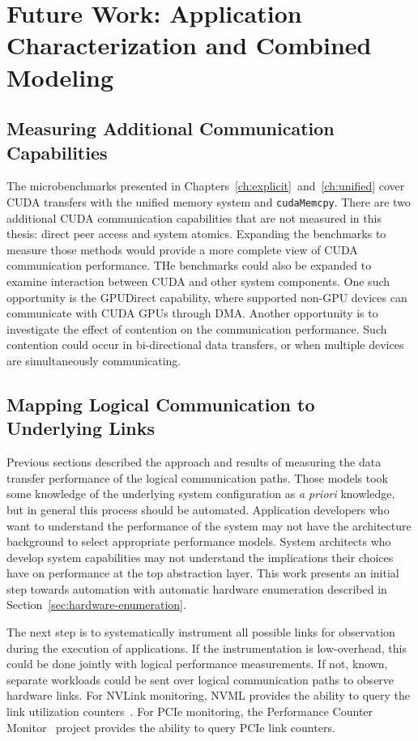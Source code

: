 \chapter{Future Work: Application Characterization and Combined Modeling}
\label{ch:future}

\section{Measuring Additional Communication Capabilities}

The microbenchmarks presented in Chapters~\ref{ch:explicit}~and~\ref{ch:unified} cover CUDA transfers with the unified memory system and \texttt{cudaMemcpy}.
There are two additional CUDA communication capabilities that are not measured in this thesis: direct peer access and system atomics.
Expanding the benchmarks to measure those methods would provide a more complete view of CUDA communication performance.
THe benchmarks could also be expanded to examine interaction between CUDA and other system components.
One such opportunity is the GPUDirect capability, where supported non-GPU devices can communicate with CUDA GPUs through DMA.
Another opportunity is to investigate the effect of contention on the communication performance.
Such contention could occur in bi-directional data transfers, or when multiple devices are simultaneously communicating.

\section{Mapping Logical Communication to Underlying Links}
\label{sec:map-underlying}

Previous sections described the approach and results of measuring the data transfer performance of the logical communication paths.
Those models took some knowledge of the underlying system configuration as \textit{a priori} knowledge, but in general this process should be automated.
Application developers who want to understand the performance of the system may not have the architecture background to select appropriate performance models.
System architects who develop system capabilities may not understand the implications their choices have on performance at the top abstraction layer.
This work presents an initial step towards automation with automatic hardware enumeration described in Section~\ref{sec:hardware-enumeration}.

The next step is to systematically instrument all possible links for observation during the execution of applications.
If the instrumentation is low-overhead, this could be done jointly with logical performance measurements.
If not, known, separate workloads could be sent over logical communication paths to observe hardware links.
For NVLink monitoring, NVML provides the ability to query the link utilization counters~\cite{nvidia2017nvmlreference}.
For PCIe monitoring, the Performance Counter Monitor~\cite{opcm2018pcm} project provides the ability to query PCIe link counters.


